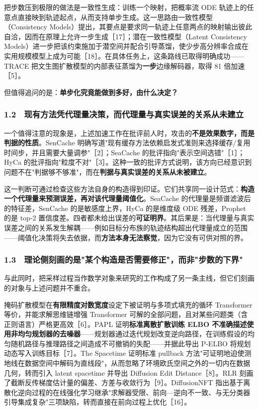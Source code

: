 \documentclass[12pt,a4paper]{ctexart}
\begin{document}
把步数压到极限的做法是一致性生成：训练一个映射，把概率流 ODE 轨迹上的任意点直接映到轨迹起点，从而支持单步生成。这一思路由一致性模型（Consistency Models）提出，其要点是要求同一轨迹上任意两点的映射输出彼此自洽，因而在原理上允许一步生成［17］；潜在一致性模型（Latent Consistency Models）进一步把该约束施加于潜空间并配合引导蒸馏，使少步高分辨率合成在实用规模模型上成为可能［18］。在具体任务上，这条路线已取得明确成功——TRACE 把文生图扩散模型的内部表征蒸馏为\textbf{一步}边缘解码器，取得 81 倍加速［5］。

但值得追问的是：\textbf{单步化究竟能做到多好，由什么决定？}

\subsubsection*{1.2　现有方法凭代理量决策，而代理量与真实误差的关系从未建立}

一个值得注意的现象是，上述加速工作在批评前人时，攻击的\textbf{不是效果数字，而是判据的性质}。SenCache 明确写道"现有缓存方法依赖启发式准则来选择缓存/复用时间步，并且需要大量调参"［2］；SeaCache 的批评指向"表示空间选错"［1］；HyCa 的批评指向"粒度不对"［3］。这种一致的批评方式说明，该方向已经意识到问题不在"判据够不够准"，而在\textbf{判据与真实误差的关系从未被建立}。

这一判断可通过检查这些方法自身的构造得到印证。它们共享同一设计范式：\textbf{构造一个代理量来预测误差，再对该代理量阈值化}。SeaCache 的代理量是频谱滤波后的特征差，SenCache 的是敏感度上界，HyCa 的是维度级 ODE 残差，Prophet 的是 top-2 置信度差。四者都未给出误差的\textbf{可证明界}。其后果是：当代理量与真实误差之间的关系发生解耦——例如目标分布族的轨迹结构超出代理量成立的范围——阈值化决策将失去依据，而\textbf{方法本身无法察觉}，因为它没有可供对照的界。

\subsubsection*{1.3　理论侧刻画的是"某个构造是否需要修正"，而非"步数的下界"}

与此同时，把采样过程当作数学对象来研究的工作构成了另一条主线，但它们刻画的对象与上述问题并不重合。

掩码扩散模型在\textbf{有限精度对数宽度}设定下被证明与多项式填充的循环 Transformer 等价，并能求解思维链增强 Transformer 可解的全部问题，且对某些问题类（含正则语言）严格更高效［6］。PAPL 证明\textbf{标准离散扩散训练 ELBO 不准确描述使用非均匀规划器的去噪器}——规划器通过迭代规划改变逆向路径，在训练假设的均匀随机路径与推理路径之间造成不可撤销的失配——并据此导出 P-ELBO 将规划动态写入训练目标［7］。The Spacetime 证明标准 pullback 方法"可证明地迫使测地线在数据空间中解码为直线段"，从而忽略了环境欧氏空间之外的一切内在数据几何，转而引入 latent spacetime 并导出 Diffusion Edit Distance［8］。RLR 刻画了截断反传梯度估计量的偏差、方差与收敛行为［9］。DiffusionNFT 指出基于离散化逆向过程的在线强化学习继承"求解器受限、前向—逆向不一致、与无分类器引导集成复杂"三项缺陷，转而直接在前向过程上优化［16］。
\end{document}
